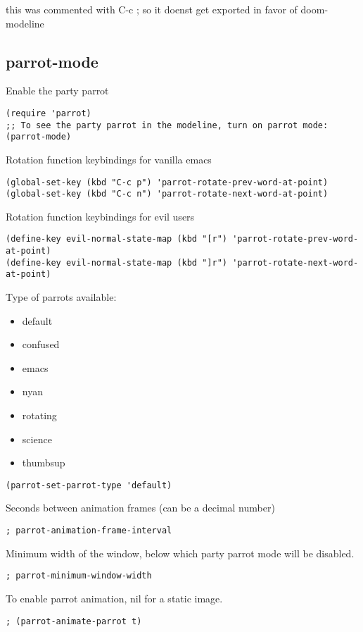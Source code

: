 \documentclass[11pt]{article}
\begin{document}
this was commented with C-c ; so it doenst get exported in favor of doom-modeline 
\subsection*{parrot-mode}
\label{sec:orged3a72a}

Enable the party parrot
\begin{verbatim}
(require 'parrot)
;; To see the party parrot in the modeline, turn on parrot mode:
(parrot-mode)  
\end{verbatim}


Rotation function keybindings for vanilla emacs
\begin{verbatim}
(global-set-key (kbd "C-c p") 'parrot-rotate-prev-word-at-point)
(global-set-key (kbd "C-c n") 'parrot-rotate-next-word-at-point)
\end{verbatim}

Rotation function keybindings for evil users
\begin{verbatim}
(define-key evil-normal-state-map (kbd "[r") 'parrot-rotate-prev-word-at-point)
(define-key evil-normal-state-map (kbd "]r") 'parrot-rotate-next-word-at-point)
\end{verbatim}

Type of parrots available:

\begin{itemize}
\item default
\item confused
\item emacs
\item nyan
\item rotating
\item science
\item thumbsup
\end{itemize}

\begin{verbatim}
(parrot-set-parrot-type 'default)
\end{verbatim}

Seconds between animation frames (can be a decimal number)
\begin{verbatim}
; parrot-animation-frame-interval  
\end{verbatim}

Minimum width of the window, below which party parrot mode will be disabled.
\begin{verbatim}
; parrot-minimum-window-width 
\end{verbatim}


To enable parrot animation, nil for a static image.
\begin{verbatim}
; (parrot-animate-parrot t) 
\end{verbatim}
\end{document}

